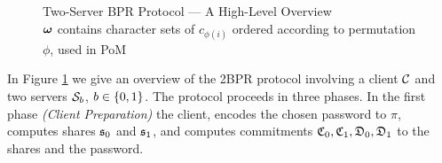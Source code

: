 \begin{figure}[!b]
{}
\caption[Two-Server BPR Protocol]{Two-Server BPR Protocol --- A High-Level Overview\\
{\small $\boldsymbol{\mathbf{\omega}}$ contains character sets of $c_{\phi(i)}$ ordered according to permutation $\phi$, used in \ac{PoM}}}
\label{fig:protocol-overview}
\end{figure}
In Figure \ref{fig:protocol-overview} we give an overview of the \ac{2BPR} protocol involving a client $\mathcal{C}$ and two servers $\mathcal{S}_b$, $b\in\{0,1\}$.
The protocol proceeds in three phases.
In the first phase \emph{(Client Preparation)} the client, encodes the chosen password \pwd to $\pi$, computes shares $\mathfrak{s}_{0}$ and $\mathfrak{s}_{1}$, and computes commitments $\mathfrak{C}_0, \mathfrak{C}_1, \mathfrak{D}_0, \mathfrak{D}_1$ to the shares and the password.

